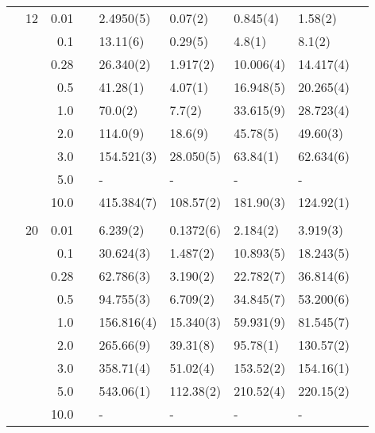 \begin{table}[H]
\begin{tabularx}{\textwidth}{R{1cm}rrcR{2.3cm}R{2.3cm}R{2.3cm}R{2.3cm}R{1cm}}
		&12 & 0.01 && 2.4950(5) & 0.07(2) & 0.845(4) & 1.58(2) \\
		&& 0.1 && 13.11(6) & 0.29(5) & 4.8(1) & 8.1(2) \\
		&& 0.28 && 26.340(2) & 1.917(2) & 10.006(4) & 14.417(4) \\
		&& 0.5 && 41.28(1) & 4.07(1) & 16.948(5) & 20.265(4) \\
		&& 1.0 && 70.0(2) & 7.7(2) & 33.615(9) & 28.723(4) \\
		&& 2.0 && 114.0(9) & 18.6(9) & 45.78(5) & 49.60(3) \\
		&& 3.0 && 154.521(3) & 28.050(5) & 63.84(1) & 62.634(6) \\ 
		&& 5.0 && - & - & - & -\\
		&& 10.0 && 415.384(7) & 108.57(2) & 181.90(3) & 124.92(1) \\
		\hdashline \\
		
		&20 & 0.01 && 6.239(2) & 0.1372(6) & 2.184(2) & 3.919(3) \\
		&& 0.1 && 30.624(3) & 1.487(2) & 10.893(5) & 18.243(5) \\
		&& 0.28 && 62.786(3) & 3.190(2) & 22.782(7) & 36.814(6) \\
		&& 0.5 && 94.755(3) & 6.709(2) & 34.845(7) & 53.200(6) \\
		&& 1.0 && 156.816(4) & 15.340(3) & 59.931(9) & 81.545(7) \\
		&& 2.0 && 265.66(9) & 39.31(8) & 95.78(1) & 130.57(2) \\
		&& 3.0 && 358.71(4) & 51.02(4) & 153.52(2) & 154.16(1) \\ 
		&& 5.0 && 543.06(1) & 112.38(2) & 210.52(4) & 220.15(2) \\
		&& 10.0 && - & - & - & -\\
		\hline\hline
	\end{tabularx}
\end{table}


